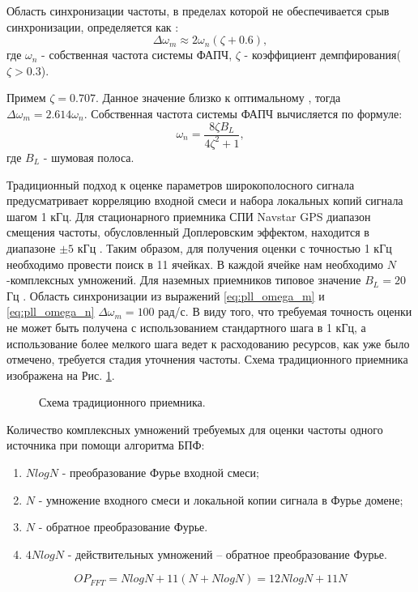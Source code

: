 Область синхронизации частоты, в пределах которой не обеспечивается срыв синхронизации, определяется как \cite{spilker-book}:
\begin{equation}
	\label{eq:pll_omega_m}
	\Delta \omega_m \approx 2 \omega_n (\zeta+0.6),
\end{equation}
где ${\omega_n}$ - собственная частота системы ФАПЧ, ${\zeta}$ - коэффициент демпфирования(${\zeta > 0.3}$).

Примем ${\zeta = 0.707}$. Данное значение   близко к оптимальному \cite{tsui, spilker-book}, тогда ${\Delta \omega_m = 2.614 \omega_n}$.
Собственная частота системы ФАПЧ вычисляется по формуле:
\begin{equation}
	\label{eq:pll_omega_n}
	\omega_n = \frac{8 \zeta B_L}{4 \zeta^2 + 1},
\end{equation}
где ${B_L}$ - шумовая полоса.

Традиционный подход к оценке параметров широкополосного сигнала предусматривает корреляцию входной смеси и набора локальных копий сигнала шагом 1 кГц.
Для стационарного приемника СПИ Navstar GPS диапазон смещения частоты, обусловленный Доплеровским эффектом, находится в диапазоне ${\pm 5}$ кГц \cite{tsui, shahtarin_sync}.
Таким образом, для получения оценки с точностью 1 кГц необходимо провести поиск в 11 ячейках. В каждой ячейке нам необходимо ${N}$-комплексных умножений.
Для наземных приемников типовое значение ${B_L=20}$ Гц \cite{tsui}. Область синхронизации из выражений \ref{eq:pll_omega_m} и \ref{eq:pll_omega_n}
${\Delta \omega_m = 100}$ рад/с. В виду того, что требуемая точность оценки не может быть получена с использованием стандартного шага в 1 кГц,
а использование более мелкого шага ведет к расходованию ресурсов, как уже было отмечено, требуется стадия уточнения частоты.
Схема традиционного приемника изображена на Рис. \ref{pic:corr_scheme}.
\begin{figure}[h]
	\center{}
	\caption{Схема традиционного приемника.}
	\label{pic:corr_scheme}
\end{figure}

Количество комплексных умножений требуемых для оценки частоты одного источника при помощи алгоритма БПФ:
\begin{enumerate}
\item ${NlogN}$ - преобразование Фурье входной смеси;
\item ${N}$ - умножение входного смеси и локальной копии сигнала в Фурье домене;
\item ${N}$ - обратное преобразование Фурье.
\item ${4NlogN}$ - действительных умножений – обратное преобразование Фурье. 
\end{enumerate}
\begin{equation}
	\label{eq:op_fft}
	OP_{FFT} = NlogN + 11(N + NlogN) = 12NlogN + 11N
\end{equation}

